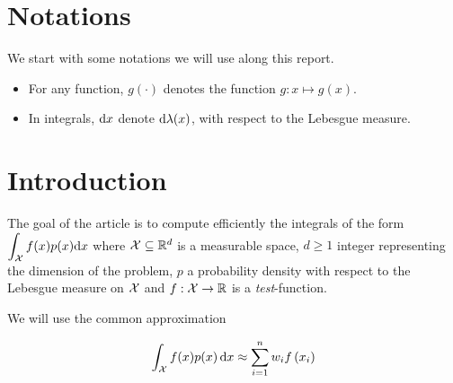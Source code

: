 \section*{Notations}
We start with some notations we will use along this report.
\begin{itemize}[font= \color{blue} \large, label= $\bullet$]
 \item For any function, $g(\cdot)$ denotes the function $g: x \mapsto g(x)$.
 \item In integrals, $\mathop{}\mathopen{}\mathrm{d} x$ denote $\mathop{}\mathopen{}\mathrm{d} \lambda(x)$, \ie with respect to the Lebesgue measure.
\end{itemize}

\section*{Introduction}

The goal of the article \cite{FWBQ} is to compute efficiently the integrals of the form
$ \displaystyle \int _ { \mathcal{X} } f ( x ) p ( x ) \mathrm { d } x$
where $\mathcal{X} \subseteq \mathbb{R} ^ { d }$ is a measurable space,
$d \geq 1$ integer representing the dimension of the problem, $p$ a probability
density with respect to the Lebesgue measure on $\mathcal{X}$ and $f : \mathcal{X} \rightarrow \mathbb{R}$
 is a \textit{test}-function.

 We will use the common approximation
 \begin{boxproblem}
   \begin{equation}
  \int _ { \mathcal{X} } f ( x ) p ( x ) \mathop{}\mathopen{}\mathrm{d} x \approx \sum _ { i = 1 } ^ { n } w _ { i } f \left( x _ { i } \right)
   \end{equation}
 \end{boxproblem}

